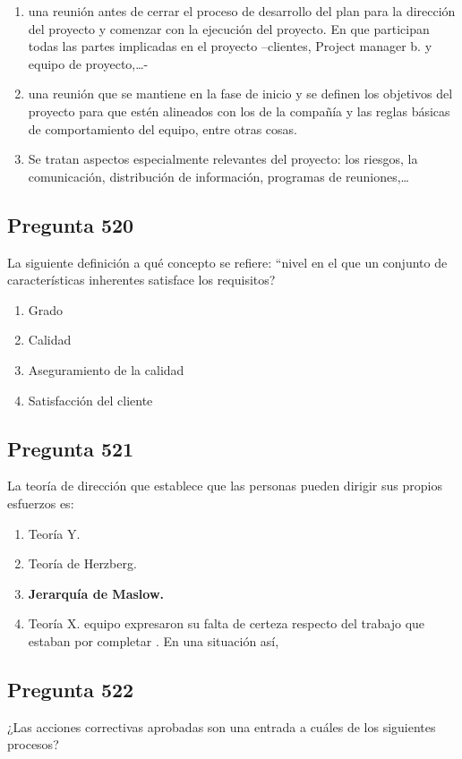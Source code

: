 \documentclass[11pt,a4paper]{article}
\begin{document}
\begin{enumerate}[label=\alph*)]
  \item una reunión antes de cerrar el proceso de desarrollo del plan para la dirección del proyecto y comenzar con la ejecución del proyecto. En que participan todas las partes implicadas en el proyecto –clientes, Project manager b. y equipo de proyecto,…-
  \item una reunión que se mantiene en la fase de inicio y se definen los objetivos del proyecto para que estén alineados con los de la compañía y las reglas básicas de comportamiento del equipo, entre otras cosas.
  \item Se tratan aspectos especialmente relevantes del proyecto: los riesgos, la comunicación, distribución de información, programas de reuniones,…
\end{enumerate}

\subsection*{Pregunta 520}
La siguiente definición a qué concepto se refiere: ``nivel en el que un conjunto de características inherentes satisface los requisitos?

\begin{enumerate}[label=\alph*)]
  \item Grado
  \item Calidad
  \item Aseguramiento de la calidad
  \item Satisfacción del cliente
\end{enumerate}

\subsection*{Pregunta 521}
La teoría de dirección que establece que las personas pueden dirigir sus propios esfuerzos es:

\begin{enumerate}[label=\alph*)]
  \item Teoría Y.
  \item Teoría de Herzberg.
  \item \textbf{Jerarquía de Maslow.}
  \item Teoría X. equipo expresaron su falta de certeza respecto del trabajo que estaban por completar . En una situación así,
\end{enumerate}

\subsection*{Pregunta 522}
¿Las acciones correctivas aprobadas son una entrada a cuáles de los siguientes procesos?
\end{document}
